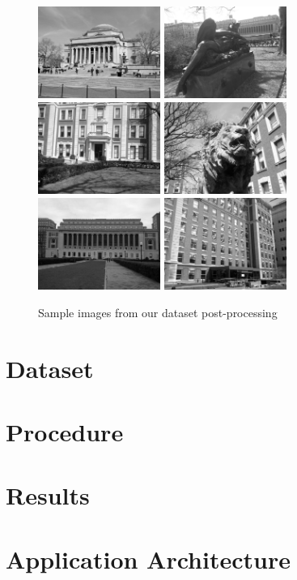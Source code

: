 \documentclass[twocolumn]{article}
\newcommand{\sectionfile}[3]{\section{#1} \label{sec:#2} }
\begin{document}
\begin{figure}
\includegraphics[width=40mm]{sample_data1.jpg}
\includegraphics[width=40mm]{sample_data2.jpg}
\includegraphics[width=40mm]{sample_data3.jpg}
\includegraphics[width=40mm]{sample_data4.jpg}
\includegraphics[width=40mm]{sample_data5.jpg}
\includegraphics[width=40mm]{sample_data6.JPG}
\caption{Sample images from our dataset post-processing}
\label{overflow}
\end{figure}
\sectionfile{Dataset}{dataset}{dataset.tex}

\sectionfile{Procedure}{procedure}{procedure.tex}

\sectionfile{Results}{results}{results.tex}

\sectionfile{Application Architecture}{application_architecture}{application_architecture.tex}

\nocite{*}
{\small


}
\end{document}
